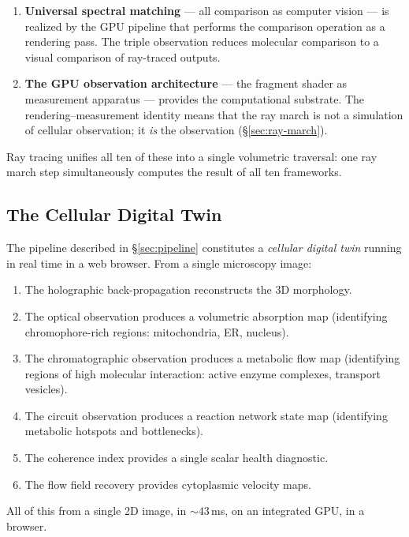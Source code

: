 \documentclass[11pt,twocolumn,a4paper]{article}
\begin{document}
\begin{enumerate}[leftmargin=*,itemsep=2pt]
\item \textbf{Universal spectral matching} --- all comparison as
  computer vision --- is realized by the GPU pipeline that performs
  the comparison operation as a rendering pass. The triple observation
  reduces molecular comparison to a visual comparison of ray-traced
  outputs.

\item \textbf{The GPU observation architecture} --- the fragment
  shader as measurement apparatus --- provides the computational
  substrate. The rendering--measurement identity means that the ray
  march is not a simulation of cellular observation; it \emph{is}
  the observation (\S\ref{sec:ray-march}).
\end{enumerate}

Ray tracing unifies all ten of these into a single volumetric
traversal: one ray march step simultaneously computes the result of
all ten frameworks.

\subsection{The Cellular Digital Twin}

The pipeline described in \S\ref{sec:pipeline} constitutes a
\emph{cellular digital twin} running in real time in a web browser.
From a single microscopy image:

\begin{enumerate}[leftmargin=*,itemsep=2pt]
\item The holographic back-propagation reconstructs the 3D
  morphology.
\item The optical observation produces a volumetric absorption map
  (identifying chromophore-rich regions: mitochondria, ER, nucleus).
\item The chromatographic observation produces a metabolic flow map
  (identifying regions of high molecular interaction: active enzyme
  complexes, transport vesicles).
\item The circuit observation produces a reaction network state map
  (identifying metabolic hotspots and bottlenecks).
\item The coherence index provides a single scalar health diagnostic.
\item The flow field recovery provides cytoplasmic velocity maps.
\end{enumerate}

All of this from a single 2D image, in $\sim\!43$\,ms, on an
integrated GPU, in a browser.
\end{document}
